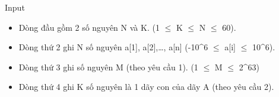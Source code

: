 Input
\begin{itemize}
	\item     Dòng đầu gồm 2 số nguyên N và K. (1  $\le$  K  $\le$  N  $\le$  60).   
	\item     Dòng thứ 2 ghi N số nguyên a[1], a[2],…, a[n] (-10^6  $\le$  a[i]  $\le$  10^6).   
	\item     Dòng thứ 3 ghi số nguyên M (theo yêu cầu 1). (1  $\le$  M  $\le$  2^63)   
	\item     Dòng thứ 4 ghi K số nguyên là 1 dãy con của dãy A (theo yêu cầu 2).   
\end{itemize}
